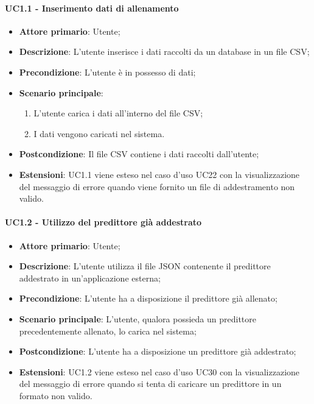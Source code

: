 \paragraph{UC1.1 - Inserimento dati di allenamento}
\label{para:uc1.1}
\begin{itemize}
  \item \textbf{Attore primario}: Utente;
  \item \textbf{Descrizione}: L'utente inserisce i dati raccolti da un database in un file CSV;
  \item \textbf{Precondizione}: L'utente è in possesso di dati;
  \item \textbf{Scenario principale}:
  \begin{enumerate}
    \item L'utente carica i dati all'interno del file CSV;
    \item I dati vengono caricati nel sistema.
  \end{enumerate}
  \item \textbf{Postcondizione}: Il file CSV contiene i dati raccolti dall'utente;
  \item \textbf{Estensioni}: UC1.1 viene esteso nel caso d'uso UC22 con la visualizzazione del messaggio di errore quando viene fornito un file di addestramento non valido.
\end{itemize}

\paragraph{UC1.2 - Utilizzo del predittore già addestrato}
\label{para:uc1.2}
\begin{itemize}
  \item \textbf{Attore primario}: Utente;
  \item \textbf{Descrizione}: L'utente utilizza il file JSON contenente il predittore addestrato in un'applicazione esterna;
  \item \textbf{Precondizione}: L'utente ha a disposizione il predittore già allenato;
  \item \textbf{Scenario principale}: L'utente, qualora possieda un predittore precedentemente allenato, lo carica nel sistema;
  \item \textbf{Postcondizione}: L'utente ha a disposizione un predittore già addestrato;
  \item \textbf{Estensioni}: UC1.2 viene esteso nel caso d'uso UC30 con la visualizzazione del messaggio di errore quando si tenta di caricare un predittore in un formato non valido.
\end{itemize}

